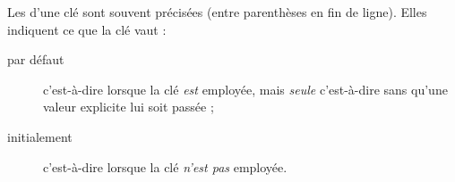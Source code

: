 \documentclass[english,nolocaltoc]{nwejmart}
\newtheorem[style=definition]{fait}
\newtheorem[title=expérience]{experience}
\newtheorem[title-plural=anneaux]{anneau}
\newtheorem[title=idéal,title-plural=idéaux]{ideal}
\begin{document}
Les  d'une clé sont souvent précisées
(entre parenthèses en fin de ligne). Elles indiquent ce que la clé vaut :
\begin{description}
\item[par défaut] c'est-à-dire lorsque la clé \emph{est} employée, mais
  \emph{seule} c'est-à-dire sans qu'une valeur explicite lui soit passée ;
\item[initialement] c'est-à-dire lorsque la clé \emph{n'est pas} employée.
\end{description}
%
\printbibliography[category=documentation]
%
%
\printindex
\end{document}
